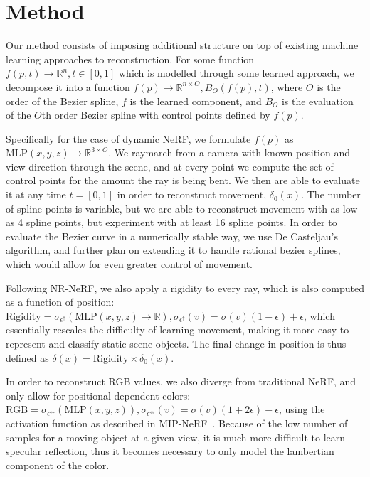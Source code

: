 \section{Method}

Our method consists of imposing additional structure on top of existing machine learning
approaches to reconstruction. For some function $f(p, t)\to\mathbb{R}^n, t\in[0,1]$ which is modelled through
some learned approach, we decompose it into a function $f(p)\to\mathbb{R}^{n\times O}, B_O(f(p), t)$, where
$O$ is the order of the Bezier spline, $f$ is the learned component, and $B_O$ is the evaluation
of the $O$th order Bezier spline with control points defined by $f(p)$.

Specifically for the case of dynamic NeRF, we formulate $f(p)$ as
$\text{MLP}(x,y,z)\to\mathbb{R}^{3\times O}$. We raymarch from a camera with known position and
view direction through the scene, and at every point we compute the set of control points for
the amount the ray is being bent. We then are able to evaluate it at any time $t=[0,1]$ in order
to reconstruct movement, $\delta_0(x)$. The number of spline points is variable, but we are able
to reconstruct movement with as low as 4 spline points, but experiment with at least 16 spline
points. In order to evaluate the Bezier curve in a numerically stable way, we use De Casteljau's
algorithm, and further plan on extending it to handle rational bezier splines, which would allow
for even greater control of movement.

Following NR-NeRF, we also apply a rigidity to every ray, which is also computed as a function of position:
$\text{Rigidity} =\sigma_{\epsilon^\uparrow}(\text{MLP}(x,y,z)\to\mathbb{R}),
\sigma_{\epsilon^\uparrow}(v) = \sigma(v)(1-\epsilon) + \epsilon$, which essentially rescales the
difficulty of learning movement, making it more easy to represent and classify static scene
objects. The final change in position is thus defined as $\delta(x) = \text{Rigidity}\times
\delta_0(x)$.

In order to reconstruct RGB values, we also diverge from traditional NeRF, and only allow for
positional dependent colors: $\text{RGB} =
\sigma_{\epsilon^\Longleftrightarrow}(\text{MLP}(x,y,z)),
\sigma_{\epsilon^\Longleftrightarrow}(v) = \sigma(v)(1+2\epsilon) - \epsilon$, using the
activation function as described in MIP-NeRF~\cite{mipnerf}. Because of the low number of
samples for a moving object at a given view, it is much more difficult to learn specular
reflection, thus it becomes necessary to only model the lambertian component of the color.

